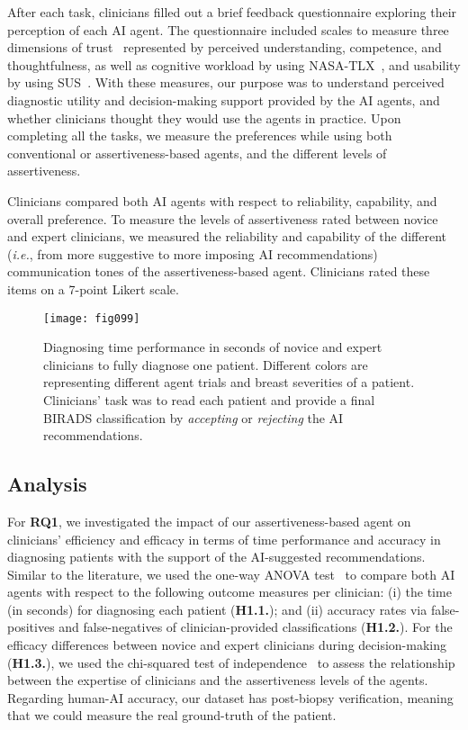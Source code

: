 After each task, clinicians filled out a brief feedback questionnaire exploring their perception of each AI agent.
The questionnaire included scales to measure three dimensions of trust~\cite{Loper2020} represented by perceived understanding, competence, and thoughtfulness, as well as cognitive workload by using NASA-TLX~\cite{info:doi/10.2196/19472}, and usability by using SUS~\cite{doi:10.1080/10447318.2018.1455307}.
With these measures, our purpose was to understand perceived diagnostic utility and decision-making support provided by the AI agents, and whether clinicians thought they would use the agents in practice.
Upon completing all the tasks, we measure the preferences while using both conventional or assertiveness-based agents, and the different levels of assertiveness.

Clinicians compared both AI agents with respect to reliability, capability, and overall preference.
To measure the levels of assertiveness rated between novice and expert clinicians, we measured the reliability and capability of the different ({\it i.e.}, from more suggestive to more imposing AI recommendations) communication tones of the assertiveness-based agent.
Clinicians rated these items on a 7-point Likert scale.

\begin{figure*}[htpb]
\centering
\texttt{[image: fig099]}
\caption[]{Diagnosing time performance in seconds of novice and expert clinicians to fully diagnose one patient. Different colors are representing different agent trials and breast severities of a patient. Clinicians' task was to read each patient and provide a final BIRADS classification by {\it accepting} or {\it rejecting} the AI recommendations.}
\label{fig:fig099}
\end{figure*}

\subsection{Analysis}
\label{sec:chap006005005}

For {\bf RQ1}, we investigated the impact of our assertiveness-based agent on clinicians' efficiency and efficacy in terms of time performance and accuracy in diagnosing patients with the support of the AI-suggested recommendations.
Similar to the literature, we used the one-way \ac{ANOVA} test~\cite{SADEGHI2022105554, 10.1145/3491102.3517791} to compare both AI agents with respect to the following outcome measures per clinician:
(i) the time (in seconds) for diagnosing each patient ({\bf H1.1.}); and
(ii) accuracy rates via false-positives and false-negatives of clinician-provided classifications ({\bf H1.2.}).
For the efficacy differences between novice and expert clinicians during decision-making ({\bf H1.3.}), we used the chi-squared test of independence~\cite{10.1145/3411764.3445464} to assess the relationship between the expertise of clinicians and the assertiveness levels of the agents.
Regarding human-AI accuracy, our dataset has post-biopsy verification, meaning that we could measure the real ground-truth of the patient.

